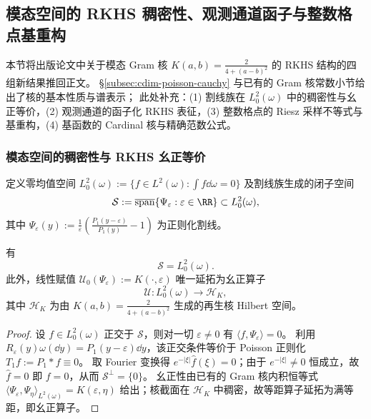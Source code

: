 
\subsection{模态空间的 RKHS 稠密性、观测通道函子与整数格点基重构}\label{subsec:cdim-rkhs-lattice-cardinal}

本节将出版论文中关于模态 Gram 核 \(K(a,b)=\frac{2}{4+(a-b)^2}\) 的 RKHS 结构的四组新结果推回正文。
\S\ref{subsec:cdim-poisson-cauchy} 与已有的 Gram 核常数小节给出了核的基本性质与谱表示；
此处补充：(1) 割线族在 \(L^2_0(\omega)\) 中的稠密性与幺正等价，(2) 观测通道的函子化 RKHS 表征，(3) 整数格点的 Riesz 采样不等式与基重构，(4) 基函数的 Cardinal 核与精确范数公式。

\subsubsection{模态空间的稠密性与 RKHS 幺正等价}

定义零均值空间 \(L^2_0(\omega):=\{f\in L^2(\omega):\int f\dd\omega=0\}\) 及割线族生成的闭子空间
\[
\mathcal{S}:=\overline{\operatorname{span}}\{\Psi_\varepsilon:\varepsilon\in\RR\}\subset L^2_0(\omega),
\]
其中 \(\Psi_\varepsilon(y):=\frac{1}{\varepsilon}\left(\frac{P_1(y-\varepsilon)}{P_1(y)}-1\right)\) 为正则化割线。

\begin{theorem}\label{thm:mode-space-rkhs-density}
有
\[
\mathcal{S}=L^2_0(\omega).
\]
此外，线性赋值 \(\mathcal{U}_0(\Psi_\varepsilon):=K(\cdot,\varepsilon)\) 唯一延拓为幺正算子
\[
\mathcal{U}:L^2_0(\omega)\longrightarrow\mathcal{H}_K,
\]
其中 \(\mathcal{H}_K\) 为由 \(K(a,b)=\frac{2}{4+(a-b)^2}\) 生成的再生核 Hilbert 空间。
\end{theorem}

\begin{proof}
设 \(f\in L^2_0(\omega)\) 正交于 \(\mathcal{S}\)，则对一切 \(\varepsilon\neq 0\) 有 \(\langle f,\Psi_\varepsilon\rangle=0\)。
利用 \(R_\varepsilon(y)\omega(\dd y)=P_1(y-\varepsilon)\dd y\)，该正交条件等价于 Poisson 正则化 \(T_1 f:=P_1*f\equiv 0\)。
取 Fourier 变换得 \(e^{-|\xi|}\widehat{f}(\xi)=0\)；由于 \(e^{-|\xi|}\neq 0\) 恒成立，故 \(\widehat{f}=0\) 即 \(f=0\)，从而 \(\mathcal{S}^\perp=\{0\}\)。
幺正性由已有的 Gram 核内积恒等式 \(\langle\Psi_\varepsilon,\Psi_\eta\rangle_{L^2(\omega)}=K(\varepsilon,\eta)\) 给出；核截面在 \(\mathcal{H}_K\) 中稠密，故等距算子延拓为满等距，即幺正算子。
\end{proof}

